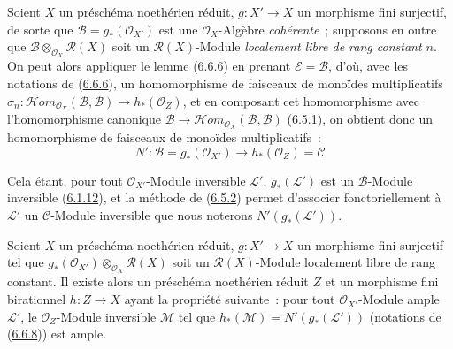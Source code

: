 \begin{env}[6.6.8]
\label{II.6.6.8-fr}
Soient $X$ un préschéma noethérien réduit, $g:X'\to X$ un morphisme fini
surjectif, de sorte que $\mathcal{B}=g_*(\mathcal{O}_{X'})$ est une
$\mathcal{O}_X$-Algèbre \emph{cohérente}~; supposons en outre que
$\mathcal{B}\otimes_{\mathcal{O}_X}\mathcal{R}(X)$ soit un
$\mathcal{R}(X)$-Module \emph{localement libre de rang constant $n$}. On peut
alors appliquer le lemme (\hyperref[II.6.6.6-fr]{6.6.6}) en prenant
$\mathcal{E}=\mathcal{B}$, d'où, avec les notations de
(\hyperref[II.6.6.6-fr]{6.6.6}), un homomorphisme de faisceaux de monoïdes
multiplicatifs
$\sigma_n:\mathcal{H}om_{\mathcal{O}_X}(\mathcal{B},\mathcal{B})
\to h_*(\mathcal{O}_Z)$, et en composant cet homomorphisme avec
l'homomorphisme canonique
$\mathcal{B}\to
\mathcal{H}om_{\mathcal{O}_X}(\mathcal{B},\mathcal{B})$
(\hyperref[II.6.5.1-fr]{6.5.1}), on obtient donc un homomorphisme de
faisceaux de monoïdes multiplicatifs~:
\[
\label{II.6.6.8.1-fr}
N':\mathcal{B}=g_*(\mathcal{O}_{X'})\longrightarrow
h_*(\mathcal{O}_Z)=\mathcal{C}
\tag{6.6.8.1}
\]

Cela étant, pour tout $\mathcal{O}_{X'}$-Module inversible $\mathcal{L}'$,
$g_*(\mathcal{L}')$ est un $\mathcal{B}$-Module inversible
(\hyperref[II.6.1.12-fr]{6.1.12}), et la méthode de
(\hyperref[II.6.5.2-fr]{6.5.2}) permet d'associer fonctoriellement à
$\mathcal{L}'$ un $\mathcal{C}$-Module inversible que nous noterons
$N'(g_*(\mathcal{L}'))$.
\end{env}

\begin{lemma}[6.6.9]
\label{II.6.6.9-fr}
Soient $X$ un préschéma noethérien réduit, $g:X'\to X$ un morphisme fini
surjectif tel que
$g_*(\mathcal{O}_{X'})\otimes_{\mathcal{O}_X}\mathcal{R}(X)$ soit un
$\mathcal{R}(X)$-Module localement libre de rang constant. Il existe alors
un préschéma noethérien réduit $Z$ et un morphisme fini birationnel
$h:Z\to X$ ayant la propriété suivante~: pour tout
$\mathcal{O}_{X'}$-Module ample $\mathcal{L}'$, le $\mathcal{O}_Z$-Module
inversible $\mathcal{M}$ tel que
$h_*(\mathcal{M})=N'(g_*(\mathcal{L}'))$ \textup{(notations de
(\hyperref[II.6.6.8-fr]{6.6.8}))} est ample.
\end{lemma}

